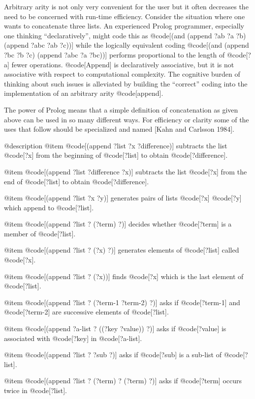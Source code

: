 {Arbitrary arity is not only very convenient for the user but it often
decreases the need to be concerned with run-time efficiency.
Consider the situation where one wants to concatenate three lists.
An experienced Prolog programmer, especially one thinking ``declaratively'',
might code this as 
@code[(and (append ?ab ?a ?b) (append ?abc ?ab ?c))]
while the logically equivalent coding
@code[(and (append ?bc ?b ?c) (append ?abc ?a ?bc))]
performs proportional to the length of @code[?a] fewer operations.
@code[Append] is declaratively associative, 
but it is not associative with respect to computational complexity.
The cognitive burden of thinking about such issues is 
alleviated by building the
``correct'' coding into the implementation of an arbitrary arity @code[append].

The power of Prolog means that a simple definition of concatenation
as given above can be used in so many different ways.
For efficiency or clarity some of the uses that follow should be 
specialized and named [Kahn and Carlsson 1984].

@description
@item @code[(append ?list ?x ?difference)]
subtracts the list @code[?x] from the beginning of @code[?list] to obtain 
@code[?difference].

@item @code[(append ?list ?difference ?x)]
subtracts the list @code[?x] from the end of @code[?list] to obtain @code[?difference].

@item @code[(append ?list ?x ?y)]
generates pairs of lists @code[?x] @code[?y] which append to @code[?list].

@item @code[(append ?list ? (?term) ?)]
decides whether @code[?term] is a member of @code[?list].

@item @code[(append ?list ? (?x) ?)]
generates elements of @code[?list] called @code[?x].

@item @code[(append ?list ? (?x))]
finds @code[?x] which is the last element of @code[?list].

@item @code[(append ?list ? (?term-1 ?term-2) ?)]
asks if @code[?term-1] and @code[?term-2] are successive elements of @code[?list].

@item @code[(append ?a-list ? ((?key ?value)) ?)]
asks if @code[?value] is associated with @code[?key] in @code[?a-list].

@item @code[(append ?list ? ?sub ?)]
asks if @code[?sub] is a sub-list of @code[?list].

@item @code[(append ?list ? (?term) ? (?term) ?)]
asks if @code[?term] occurs twice in @code[?list].

}

